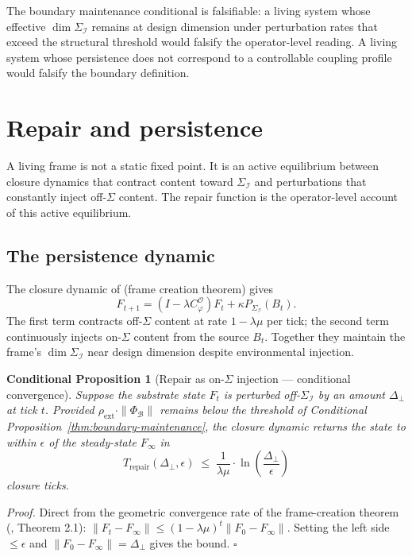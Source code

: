 \documentclass[11pt]{article}
\theoremstyle{plain}
\newtheorem{conditional}[theorem]{Conditional Proposition}
\theoremstyle{definition}
\theoremstyle{remark}
\newcommand{\Ical}{\mathcal{I}}
\newcommand{\Ocal}{\mathcal{O}}
\newcommand{\Bcal}{\mathcal{B}}
\newcommand{\Cph}{C_\varphi}
\begin{document}
The boundary maintenance conditional is falsifiable: a living system whose effective $\dim \Sigma_\Ical$ remains at design dimension under perturbation rates that exceed the structural threshold would falsify the operator-level reading. A living system whose persistence does not correspond to a controllable coupling profile would falsify the boundary definition.

\section{Repair and persistence}\label{sec:repair}

A living frame is not a static fixed point. It is an active equilibrium between closure dynamics that contract content toward $\Sigma_\Ical$ and perturbations that constantly inject off-$\Sigma$ content. The repair function is the operator-level account of this active equilibrium.

\subsection{The persistence dynamic}

The closure dynamic of \citet{SmartCosmicClosure} (frame creation theorem) gives
\[
  F_{t+1} = (I - \lambda \Cph^\Ocal) F_t + \kappa P_{\Sigma_\Ical}(B_t).
\]
The first term contracts off-$\Sigma$ content at rate $1 - \lambda \mu$ per tick; the second term continuously injects on-$\Sigma$ content from the source $B_t$. Together they maintain the frame's $\dim \Sigma_\Ical$ near design dimension despite environmental injection.

\begin{conditional}[Repair as on-$\Sigma$ injection --- conditional convergence]\label{thm:repair}
Suppose the substrate state $F_t$ is perturbed off-$\Sigma_\Ical$ by an amount $\Delta_{\perp}$ at tick $t$. Provided $\rho_{\mathrm{ext}} \cdot \|\Phi_\Bcal\|$ remains below the threshold of Conditional Proposition~\ref{thm:boundary-maintenance}, the closure dynamic returns the state to within $\epsilon$ of the steady-state $F_\infty$ in
\[
  T_{\mathrm{repair}}(\Delta_{\perp}, \epsilon) \;\leq\; \frac{1}{\lambda \mu} \cdot \ln\!\left( \frac{\Delta_{\perp}}{\epsilon} \right)
\]
closure ticks.
\end{conditional}

\noindent\emph{Proof.} Direct from the geometric convergence rate of the frame-creation theorem (\citet{SmartCosmicClosure}, Theorem 2.1): $\|F_t - F_\infty\| \leq (1 - \lambda \mu)^t \|F_0 - F_\infty\|$. Setting the left side $\leq \epsilon$ and $\|F_0 - F_\infty\| = \Delta_\perp$ gives the bound. \hfill$\square$
\end{document}
